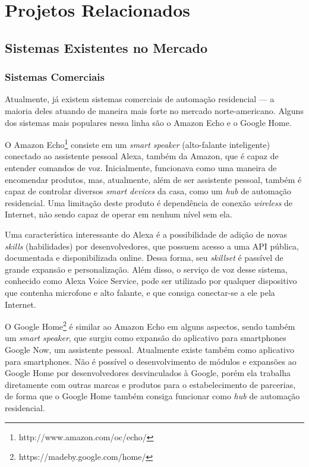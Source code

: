 \chapter{Projetos Relacionados}

\section{Sistemas Existentes no Mercado}

\subsection{Sistemas Comerciais}
Atualmente, já existem sistemas comerciais de automação residencial --- a maioria deles atuando de maneira mais forte no mercado norte-americano. Alguns dos sistemas mais populares nessa linha são o Amazon Echo e o Google Home.

O Amazon Echo\footnote{http://www.amazon.com/oc/echo/} consiste em um \textit{smart speaker} (alto-falante inteligente) conectado ao assistente pessoal Alexa, também da Amazon, que é capaz de entender comandos de voz. Inicialmente, funcionava como uma maneira de encomendar produtos, mas, atualmente, além de ser assistente pessoal, também é capaz de controlar diversos \textit{smart devices} da casa, como um \textit{hub} de automação residencial. Uma limitação deste produto é dependência de conexão \textit{wireless} de Internet, não sendo capaz de operar em nenhum nível sem ela.

Uma característica interessante do Alexa é a possibilidade de adição de novas \textit{skills} (habilidades) por desenvolvedores, que possuem acesso a uma API pública, documentada e disponibilizada online. Dessa forma, seu \textit{skillset} é passível de grande expansão e personalização. Além disso, o serviço de voz desse sistema, conhecido como Alexa Voice Service, pode ser utilizado por qualquer dispositivo que contenha microfone e alto falante, e que consiga conectar-se a ele pela Internet.

O Google Home\footnote{https://madeby.google.com/home/} é similar ao Amazon Echo em alguns aspectos, sendo também um \textit{smart speaker}, que surgiu como expansão do aplicativo para smartphones Google Now, um assistente pessoal. Atualmente existe também como aplicativo para smartphones. Não é possível o desenvolvimento de módulos e expansões ao Google Home por desenvolvedores desvinculados à Google, porém ela trabalha diretamente com outras marcas e produtos para o estabelecimento de parcerias, de forma que o Google Home também consiga funcionar como \textit{hub} de automação residencial.

